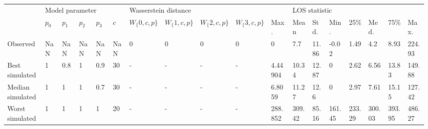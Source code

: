 \begin{tabular}{llllllllllllllllll}
\toprule
{} & \multicolumn{5}{l}{Model parameter} & \multicolumn{5}{l}{Wasserstein distance} & \multicolumn{7}{l}{LOS statistic} \\
{} &         \(p_0\) & \(p_1\) & \(p_2\) & \(p_3\) & \(c\) &        \(W_\{0,c,p\}\) & \(W_\{1,c,p\}\) & \(W_\{2,c,p\}\) & \(W_\{3,c,p\}\) &     Max. &          Mean &   Std. &    Min. &     25\% &    Med. &     75\% &    Max. \\
\midrule
Observed         &             NaN &     NaN &     NaN &     NaN &   NaN &                    0 &             0 &             0 &             0 &        0 &           7.7 &  11.86 &   -0.02 &    1.49 &     4.2 &    8.93 &  224.93 \\
Best simulated   &               1 &     0.8 &       1 &     0.9 &    30 &                    - &             - &             - &             - &  4.44904 &         10.34 &  12.87 &       0 &    2.62 &    6.56 &   13.83 &  149.88 \\
Median simulated &               1 &       1 &       1 &     0.7 &    30 &                    - &             - &             - &             - &   6.8059 &         11.27 &   12.6 &       0 &    2.97 &    7.61 &   15.15 &  127.42 \\
Worst simulated  &               1 &       1 &       1 &       1 &    20 &                    - &             - &             - &             - &  288.852 &        309.42 &  85.16 &  161.45 &  233.29 &  300.03 &  393.95 &  486.27 \\
\bottomrule
\end{tabular}
